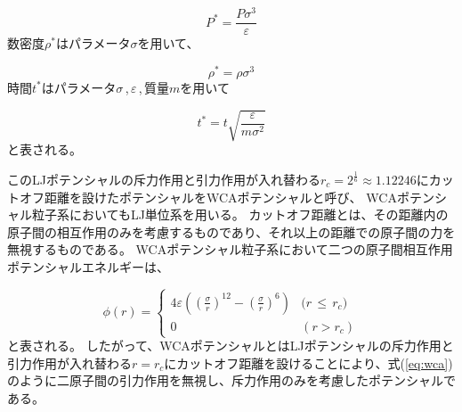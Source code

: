 \documentclass[titlepage]{jsreport}
\begin{document}
\large
\begin{equation}
P^*=\frac{P\sigma^3}{\varepsilon}\label{eq:P}
\end{equation}
\normalsize
数密度$\rho^*$はパラメータ$\sigma$を用いて、

\large
\begin{equation}
\rho^*=\rho{\sigma}^3\label{eq:rho}
\end{equation}
\normalsize
時間$t^*$はパラメータ${\sigma}$\,,\,${\varepsilon}$\,,\,質量$m$を用いて

\large
\begin{equation}
t^*=t\sqrt{\frac{\varepsilon}{m{\sigma}^2}}\label{eq:time}
\end{equation}
\normalsize
と表される。

このLJポテンシャルの斥力作用と引力作用が入れ替わる$r_c=2^{\frac{1}{6}}{\approx}1.12246$にカットオフ距離を設けたポテンシャルをWCAポテンシャルと呼び、
WCAポテンシャル粒子系においてもLJ単位系を用いる。
カットオフ距離とは、その距離内の原子間の相互作用のみを考慮するものであり、それ以上の距離での原子間の力を無視するものである\cite{WATANABE20191}。
WCAポテンシャル粒子系において二つの原子間相互作用ポテンシャルエネルギーは、

\large
\begin{equation}
\phi(r) = \left\{ \begin{array}{ll}
    4{\varepsilon}\left(\left(\frac{\sigma}{r}\right)^{12}-\left(\frac{\sigma}{r}\right)^6\right) & (r\,{\leq}\,{r_c)} \\
    0 & (r>r_c)\label{eq:wca}
\end{array} \right.
\end{equation}
\normalsize
と表される\cite{doi:10.1063/1.2176675}。
したがって、WCAポテンシャルとはLJポテンシャルの斥力作用と引力作用が入れ替わる$r=r_c$にカットオフ距離を設けることにより、式(\ref{eq:wca})のように二原子間の引力作用を無視し、斥力作用のみを考慮したポテンシャルである。
\end{document}

